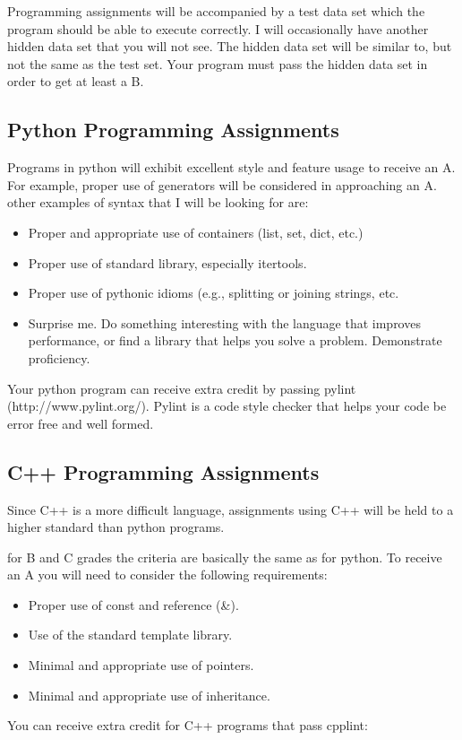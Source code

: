 \documentclass[]{article}
\begin{document}
Programming assignments will be accompanied by a test data set which the program should be able to execute correctly.  I will occasionally have another hidden data set that you will not see.  The hidden data set will be similar to, but not the same as the test set.  Your program must pass the hidden data set in order to get at least a B. 
 
\subsection{Python Programming Assignments}
Programs in python will exhibit excellent style and feature usage to receive an A.  For example, proper use of generators will be considered in approaching an A.  other examples of syntax that I will be looking for are:
\begin{itemize}
\item{Proper and appropriate use of containers (list, set, dict, etc.)}
\item{Proper use of standard library, especially itertools.}
\item{Proper use of pythonic idioms (e.g., splitting or joining strings, etc.}
\item{Surprise me.  Do something interesting with the language that improves performance, or find a library that helps you solve a problem.  Demonstrate proficiency.}
\end{itemize}
Your python program can receive extra credit by passing pylint (http://www.pylint.org/).  Pylint is a code style checker that helps your code be error free and well formed.

\subsection{C++ Programming Assignments}
Since C++ is a more difficult language, assignments using C++ will be held to a higher standard than python programs.

for B and C grades the criteria are basically the same as for python.  To receive an A you will need to consider the following requirements:
\begin{itemize}
\item{Proper use of const and reference (\&).}
\item{Use of the standard template library.}
\item{Minimal and appropriate use of pointers.}
\item{Minimal and appropriate use of inheritance.}
\end{itemize}
You can receive extra credit for C++ programs that pass cpplint:
\end{document}
